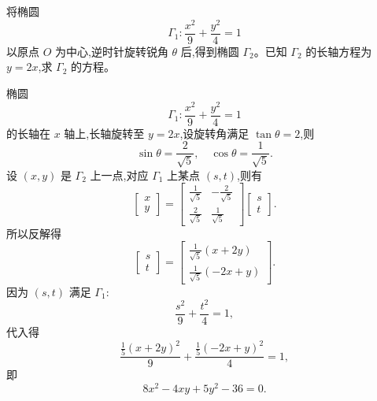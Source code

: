 \begin{questions}
    \question 将椭圆 
    \[
    \Gamma_1: \frac{x^2}{9} + \frac{y^2}{4} = 1
    \]
    以原点 $O$ 为中心,逆时针旋转锐角 $\theta$ 后,得到椭圆 $\Gamma_2$。已知 $\Gamma_2$ 的长轴方程为 $y=2x$,求 $\Gamma_2$ 的方程。
    \begin{solution}
        椭圆 $$\Gamma_1: \frac{x^2}{9} + \frac{y^2}{4} = 1$$ 的长轴在 $x$ 轴上,长轴旋转至 $y=2x$,设旋转角满足 $\tan \theta = 2$,则
        \[
        \sin \theta = \frac{2}{\sqrt{5}}, \quad \cos \theta = \frac{1}{\sqrt{5}}.
        \]
        设 $(x, y)$ 是 $\Gamma_2$ 上一点,对应 $\Gamma_1$ 上某点 $(s, t)$,则有
        \[
        \begin{bmatrix} x \\ y \end{bmatrix} =
        \begin{bmatrix} \frac{1}{\sqrt{5}} & -\frac{2}{\sqrt{5}} \\ \frac{2}{\sqrt{5}} & \frac{1}{\sqrt{5}} \end{bmatrix}
        \begin{bmatrix} s \\ t \end{bmatrix}.
        \]
        所以反解得
        \[
        \begin{bmatrix} s \\ t \end{bmatrix} =
        \begin{bmatrix} \frac{1}{\sqrt{5}}(x+2y) \\ \frac{1}{\sqrt{5}}(-2x+y) \end{bmatrix}.
        \]
        因为 $(s,t)$ 满足 $\Gamma_1$:
        \[
        \frac{s^2}{9} + \frac{t^2}{4} = 1,
        \]
        代入得
        \[
        \frac{\frac{1}{5}(x+2y)^2}{9} + \frac{\frac{1}{5}(-2x+y)^2}{4} = 1,
        \]
        即
        \[
        8x^2 - 4xy + 5y^2 - 36 = 0.
        \]
    \end{solution}


\end{questions}

